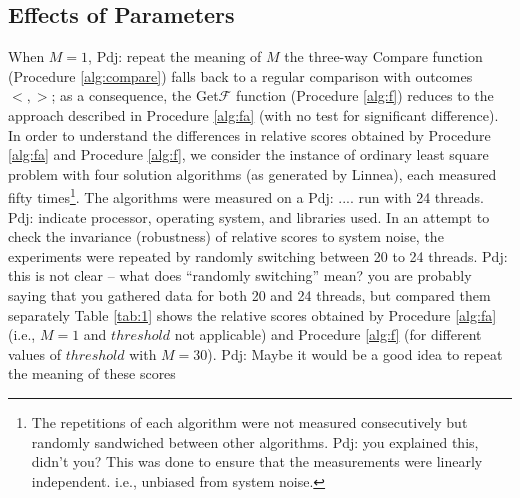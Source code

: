 \documentclass[conference]{IEEEtran}
\newcommand{\p}[1]{{\color{blue} Pdj: #1}}
\begin{document}
\subsection{Effects of Parameters}
When $M = 1$, \p{repeat the meaning of $M$}
the three-way Compare function (Procedure \ref{alg:compare}) falls back to a regular comparison with
outcomes $< , >$; as a consequence, the Get$\mathcal{F}$ function (Procedure \ref{alg:f}) reduces to the approach
described in Procedure \ref{alg:fa} (with no test for significant difference). In order to understand the differences in
relative scores obtained by Procedure \ref{alg:fa} and Procedure \ref{alg:f}, we consider the instance of ordinary least
square problem with four solution algorithms (as generated by Linnea), each measured fifty times\footnote{The
  repetitions of each algorithm were not measured consecutively but randomly sandwiched between other algorithms. \p{you
    explained this, didn't you?} This was done to ensure that the measurements were linearly independent. i.e., unbiased
  from system noise.}. The algorithms were measured on a \p{ .... } run with 24 threads.
\p{indicate processor, operating system, and libraries used.}
In an attempt  to check the invariance (robustness) of relative scores to system noise, the experiments were repeated by
randomly switching between 20 to 24 threads. \p{this is not clear -- what does ``randomly switching'' mean? you are
  probably saying that you gathered data for both 20 and 24 threads, but compared them separately} Table \ref{tab:1}
shows the relative scores obtained by Procedure \ref{alg:fa} (i.e., $M=1$  and $threshold$ not applicable) and Procedure
\ref{alg:f} (for different values of $threshold$ with $M=30$). \p{Maybe it would be a good idea to repeat the meaning of
  these scores}
\end{document}
